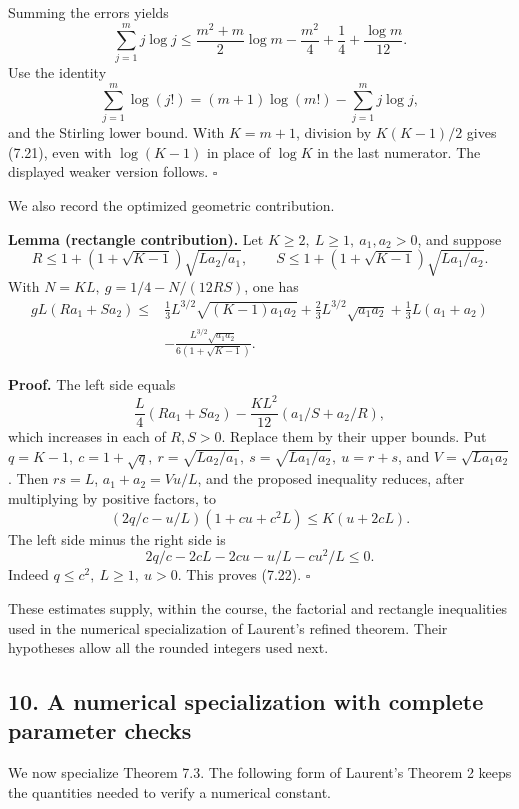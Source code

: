 \documentclass[
  11pt,
  a4paper,
]{article}
\begin{document}
Summing the errors yields \[
\sum_{j=1}^m j\log j
\le\frac{m^2+m}{2}\log m-\frac{m^2}{4}
+\frac14+\frac{\log m}{12}.
\] Use the identity \[
\sum_{j=1}^m\log(j!)=(m+1)\log(m!)-\sum_{j=1}^m j\log j,
\] and the Stirling lower bound. With \(K=m+1\), division by
\(K(K-1)/2\) gives (7.21), even with \(\log(K-1)\) in place of
\(\log K\) in the last numerator. The displayed weaker version follows.
\(\square\)

We also record the optimized geometric contribution.

\textbf{Lemma (rectangle contribution).} Let
\(K\ge2,\ L\ge1,\ a_1,a_2>0\), and suppose \[
R\le1+(1+\sqrt{K-1})\sqrt{La_2/a_1},\qquad
S\le1+(1+\sqrt{K-1})\sqrt{La_1/a_2}.
\] With \(N=KL,\ g=1/4-N/(12RS)\), one has \[
\begin{aligned}
gL(Ra_1+Sa_2)\le{}&
\frac13 L^{3/2}\sqrt{(K-1)a_1a_2}
+\frac23L^{3/2}\sqrt{a_1a_2}
+\frac13L(a_1+a_2)\\
&-\frac{L^{3/2}\sqrt{a_1a_2}}{6(1+\sqrt{K-1})}.
\end{aligned} \tag{7.22}
\]

\textbf{Proof.} The left side equals \[
\frac L4(Ra_1+Sa_2)-\frac{KL^2}{12}(a_1/S+a_2/R),
\] which increases in each of \(R,S>0\). Replace them by their upper
bounds. Put \(q=K-1,\ c=1+\sqrt q,\ r=\sqrt{La_2/a_1},\
s=\sqrt{La_1/a_2},\ u=r+s\), and \(V=\sqrt{La_1a_2}\). Then \(rs=L\),
\(a_1+a_2=Vu/L\), and the proposed inequality reduces, after multiplying
by positive factors, to \[
(2q/c-u/L)(1+cu+c^2L)\le K(u+2cL).
\] The left side minus the right side is \[
2q/c-2cL-2cu-u/L-cu^2/L\le0.
\] Indeed \(q\le c^2,\ L\ge1,\ u>0\). This proves (7.22). \(\square\)

These estimates supply, within the course, the factorial and rectangle
inequalities used in the numerical specialization of Laurent's refined
theorem. Their hypotheses allow all the rounded integers used next.

\subsection{10. A numerical specialization with complete parameter
checks}\label{a-numerical-specialization-with-complete-parameter-checks}

We now specialize Theorem 7.3. The following form of Laurent's Theorem 2
keeps the quantities needed to verify a numerical constant.
\end{document}
